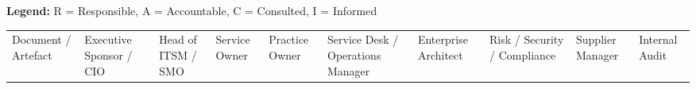 \documentclass[
  letterpaper,
  DIV=11,
  numbers=noendperiod]{scrartcl}
\begin{document}
\textbf{Legend:} R = Responsible, A = Accountable, C = Consulted, I =
Informed

\begin{longtable}[]{@{}
  >{\raggedright\arraybackslash}p{}
  >{\raggedleft\arraybackslash}p{}
  >{\raggedleft\arraybackslash}p{}
  >{\raggedleft\arraybackslash}p{}
  >{\raggedleft\arraybackslash}p{}
  >{\raggedleft\arraybackslash}p{}
  >{\raggedleft\arraybackslash}p{}
  >{\raggedleft\arraybackslash}p{}
  >{\raggedleft\arraybackslash}p{}
  >{\raggedleft\arraybackslash}p{}@{}}
\toprule\noalign{}
\begin{minipage}[b]{\linewidth}\raggedright
Document / Artefact
\end{minipage} & \begin{minipage}[b]{\linewidth}\raggedleft
Executive Sponsor / CIO
\end{minipage} & \begin{minipage}[b]{\linewidth}\raggedleft
Head of ITSM / SMO
\end{minipage} & \begin{minipage}[b]{\linewidth}\raggedleft
Service Owner
\end{minipage} & \begin{minipage}[b]{\linewidth}\raggedleft
Practice Owner
\end{minipage} & \begin{minipage}[b]{\linewidth}\raggedleft
Service Desk / Operations Manager
\end{minipage} & \begin{minipage}[b]{\linewidth}\raggedleft
Enterprise Architect
\end{minipage} & \begin{minipage}[b]{\linewidth}\raggedleft
Risk / Security / Compliance
\end{minipage} & \begin{minipage}[b]{\linewidth}\raggedleft
Supplier Manager
\end{minipage} & \begin{minipage}[b]{\linewidth}\raggedleft
Internal Audit
\end{minipage} \\

\end{longtable}
\end{document}
